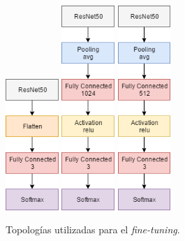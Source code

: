 \begin{figure}[H]
	\centering
	\includegraphics[width=2cm]{img/fine-tuning-topology-1}
	\includegraphics[width=2cm]{img/fine-tuning-topology-2}
	\includegraphics[width=2cm]{img/fine-tuning-topology-3}
	\caption{Topologías utilizadas para el \textit{fine-tuning}.}
	\label{fig:fine-tuning-topologies}
\end{figure}

